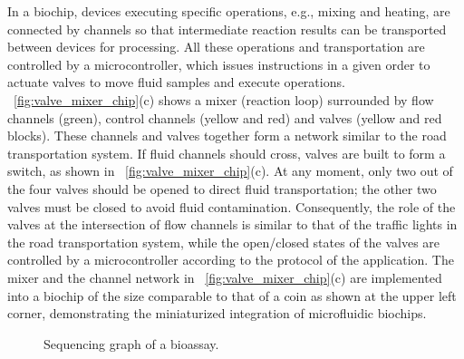 In a biochip, devices executing specific operations, e.g., mixing and heating,
are connected by channels so that intermediate reaction results %
can be
transported between devices for processing. All these operations and
transportation are controlled
by a microcontroller, which 
issues instructions in a given order to actuate valves 
to move fluid samples 
and execute operations.
\figname~\ref{fig:valve_mixer_chip}(c) shows a mixer (reaction loop) surrounded
by flow channels (green), control channels (yellow and red) and valves
(yellow and red blocks).
These channels and valves together form a network similar to the
road transportation system. If fluid channels should cross, %
valves are built %
to form a switch, as shown 
in \figname~\ref{fig:valve_mixer_chip}(c).
At any moment, only two out of the four valves should be opened to 
direct fluid transportation; 
the other two valves must be closed to avoid fluid
contamination. Consequently, the role of the valves at the intersection
of %
flow channels is similar to that of the traffic lights in the road
transportation system, while the open/closed states of the valves are
controlled by a microcontroller according to the protocol of the application.
The mixer and the channel network
in \figname~\ref{fig:valve_mixer_chip}(c)
are implemented into a biochip of the size comparable to that of a coin 
as shown %
at the upper left
corner, %
demonstrating the miniaturized integration of 
microfluidic biochips. 


\begin{figure}
    {
    \vskip -5pt
    \figurefontsize
    \centering
    
    \caption{Sequencing graph of a bioassay.}
    \label{fig:sequencing_graph}
    }
    \end{figure}

